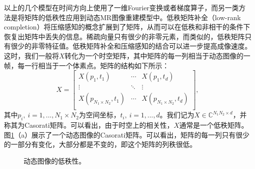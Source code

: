 以上的几个模型在时间方向上使用了一维Fourier变换或者梯度算子，而另一类方法是将矩阵的低秩性应用到动态MR图像重建模型中。低秩矩阵补全\cite{candes2009exact}（low-rank completion）将压缩感知的概念扩展到了矩阵，从而可以在低秩和非相干的条件下恢复出矩阵中丢失的信息。稀疏向量只有很少的非零元素，而类似的，低秩矩阵只有很少的非零特征值。低秩矩阵补全和压缩感知的结合可以进一步提高成像速度。这时，我们一般将$X$转化为一个时空矩阵，其中矩阵的每一列相当于动态图像的一帧，每一行相当于一个体素点。矩阵的结构如下所示：
\begin{equation}
X = 
\left[              
  \begin{array}{ccc}   
    X(p_1,t_1) & \cdots & X(p_1,t_{d})\\ 
    \vdots &\ddots & \vdots\\
    X(p_{N_1\times N_2},t_1) & \cdots & X(p_{N_1\times N_2},t_{d})\\  
  \end{array}
\right],                 
\end{equation}
其中$p_i,\ i=1,...,N_1\times N_2$为空间坐标，$t_i,\ i=1,...,d$。我们记为$X\in \mathbb{C}^{N_1N_2\times d}$，并称其为Casorati矩阵。可以看出，由于时空上的相关性，$X$通常是一个低秩矩阵。图\ref{fig:lowrank}（a）展示了一个动态图像的Casorati矩阵。可以看出，矩阵的每一列只有很少的一部分有变化，大部分都是不变的，即这个矩阵的列秩很低。
\begin{figure}[htbp]
\centering
{}
\centering
\caption{动态图像的低秩性。}
\label{fig:lowrank}
\end{figure}

